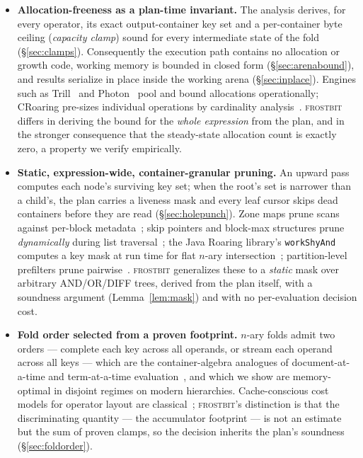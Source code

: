 \documentclass[sigconf,nonacm]{acmart}
\newcommand{\fb}{\textsc{frostbit}}
\begin{document}
\begin{itemize}
\item \textbf{Allocation-freeness as a plan-time invariant.} The analysis
  derives, for every operator, its exact output-container key set and a
  per-container byte ceiling (\emph{capacity clamp}) sound for every
  intermediate state of the fold (\S\ref{sec:clamps}). Consequently the
  execution path contains no allocation or growth code, working memory is
  bounded in closed form (\S\ref{sec:arenabound}), and results serialize
  in place inside the working arena (\S\ref{sec:inplace}). Engines such
  as Trill~\cite{trill2015} and Photon~\cite{photon2022} pool and bound
  allocations operationally; CRoaring pre-sizes individual operations by
  cardinality analysis~\cite{lemire2018}. \fb{} differs in deriving the
  bound for the \emph{whole expression} from the plan, and in the
  stronger consequence that the steady-state allocation count is exactly
  zero, a property we verify empirically.
\item \textbf{Static, expression-wide, container-granular pruning.} An
  upward pass computes each node's surviving key set; when the root's set
  is narrower than a child's, the plan carries a liveness mask and every
  leaf cursor skips dead containers before they are read
  (\S\ref{sec:holepunch}). Zone maps prune scans against per-block
  metadata~\cite{moerkotte1998,snowflake2016}; skip pointers and
  block-max structures prune \emph{dynamically} during list
  traversal~\cite{moffat1996,ding2011}; the Java Roaring library's
  \texttt{workShyAnd} computes a key mask at run time for flat $n$-ary
  intersection~\cite{roaringjava}; partition-level prefilters prune
  pairwise~\cite{fesia2020,hero2024}. \fb{} generalizes these to a
  \emph{static} mask over arbitrary
  AND/OR/DIFF trees, derived from the plan itself, with a soundness
  argument (Lemma~\ref{lem:mask}) and with no per-evaluation decision
  cost.
\item \textbf{Fold order selected from a proven footprint.} $n$-ary folds
  admit two orders --- complete each key across all operands, or stream
  each operand across all keys --- which are the container-algebra
  analogues of document-at-a-time and term-at-a-time
  evaluation~\cite{turtle1995}, and which we show are memory-optimal in
  disjoint regimes on modern hierarchies. Cache-conscious cost models for
  operator layout are classical~\cite{wolf1991,manegold2002,boncz2005};
  \fb's distinction is that the discriminating quantity --- the
  accumulator footprint --- is not an estimate but the sum of proven
  clamps, so the decision inherits the plan's soundness
  (\S\ref{sec:foldorder}).
\end{itemize}
\end{document}
